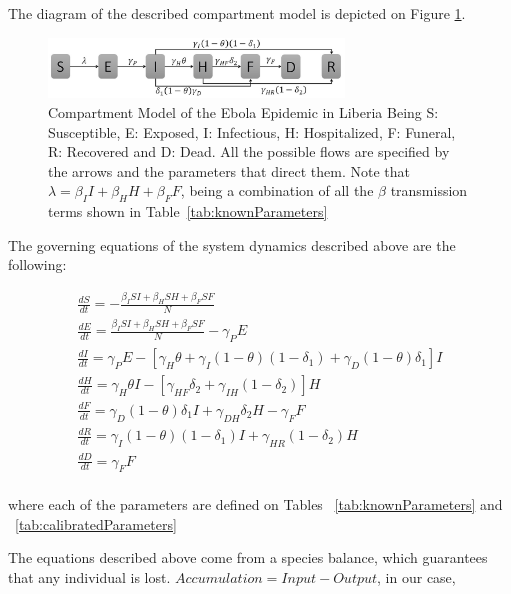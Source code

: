 The diagram of the described compartment model is depicted on Figure \ref{fig:compartment}. \\


\begin{figure}[!h]
  \centering
  \includegraphics[width=0.7\textwidth]{compartment}
  \caption{Compartment Model of the Ebola Epidemic in Liberia  \newline  Being S: Susceptible, E: Exposed, I: Infectious, H: Hospitalized, F: Funeral,  R: Recovered and D: Dead. All the possible flows are specified by the arrows and the parameters that direct them. Note that $\lambda = \beta_{I}I+\beta_{H}H+\beta_{F}F $, being a combination of all the $\beta$ transmission terms shown in Table~\ref{tab:knownParameters} } 
\label{fig:compartment} 
\end{figure}


The governing equations of the system dynamics described above are the following:

\begin{eqnarray} 
\label{SDeqn}
\frac{dS}{dt} = - \frac{\beta_{I}SI+\beta_{H}SH+\beta_{F}SF}{N} \label{eqn:SD1}\\
\frac{dE}{dt} =  \frac{\beta_{I}SI+\beta_{H}SH+\beta_{F}SF}{N}-\gamma_P E         \label{eqn:SD2}\\
\frac{dI}{dt} =  \gamma_P E - [\gamma_{H}\theta + \gamma_{I}(1-\theta)(1-\delta_{1})+\gamma_{D}(1-\theta)\delta_{1}]I   \label{eqn:SD3}\\
\frac{dH}{dt} = \gamma_{H}\theta I - [\gamma_{HF}\delta_{2}+\gamma_{IH}(1-\delta_{2})]H \label{eqn:SD4}\\
\frac{dF}{dt} = \gamma_{D}(1-\theta) \delta_{1} I + \gamma_{DH}\delta_{2} H-\gamma_{F} F     \label{eqn:SD5}\\
\frac{dR}{dt} = \gamma_{I}(1-\theta)(1- \delta_{1}) I + \gamma_{HR}(1-\delta_{2}) H       \label{eqn:SD6}\\
\frac{dD}{dt} = \gamma_{F} F     \label{eqn:SD7}
\end{eqnarray}\\

where each of the parameters are defined on Tables ~\ref{tab:knownParameters} and ~\ref{tab:calibratedParameters}



\noindent The equations described above come from a species balance, which guarantees that any individual is lost. $Accumulation = Input - Output$, in our case,

